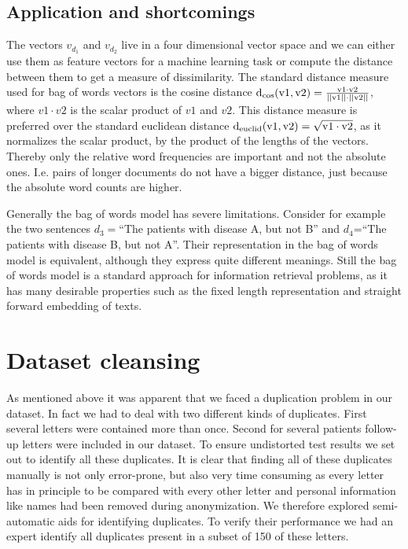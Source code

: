 \subsection*{Application and shortcomings}
The vectors $v_{d_1}$ and $v_{d_2}$ live in a four dimensional vector space and we can either use them as feature vectors for a machine learning task or compute the distance between them to get a measure of dissimilarity. The standard distance measure used for bag of words vectors is the cosine distance $\rm{d_{\cos}}(v1, v2)=\frac{v1\cdot v2}{||v1||\cdot ||v2||}$, where $v1\cdot v2$ is the scalar product of $v1$ and $v2$. This distance measure is preferred over the standard euclidean distance $\rm{d_{euclid}}(v1, v2)=\sqrt{v1\cdot v2}$, as it normalizes the scalar product, by the product of the lengths of the vectors. Thereby only the relative word frequencies are important and not the absolute ones. I.e. pairs of longer documents do not have a bigger distance, just because the absolute word counts are higher. 

Generally the bag of words model has severe limitations. Consider for example
the two sentences $d_{3}=$``The patients with disease A, but not B'' and $d_{4}$=``The patients with disease B, but not A''. Their representation in the bag of words model is equivalent,
although they express quite different meanings. Still the bag of words
model is a standard approach for information retrieval problems, as
it has many desirable properties such as the fixed length representation and straight forward embedding of texts.



\section{Dataset cleansing}

As mentioned above it was apparent that we faced a duplication problem in our dataset. In fact we had to deal with two different kinds of duplicates. First several letters were contained more than once. Second for several patients follow-up letters were included in our dataset. To ensure undistorted test results we set out to identify all these duplicates. It is clear that finding all of these duplicates manually is not only error-prone, but also very time consuming as every letter has in principle to be compared with every other letter and personal information like names had been removed during anonymization. We therefore explored semi-automatic aids for identifying duplicates. To verify their performance we had an expert identify all duplicates present in a subset of 150 of these letters.

